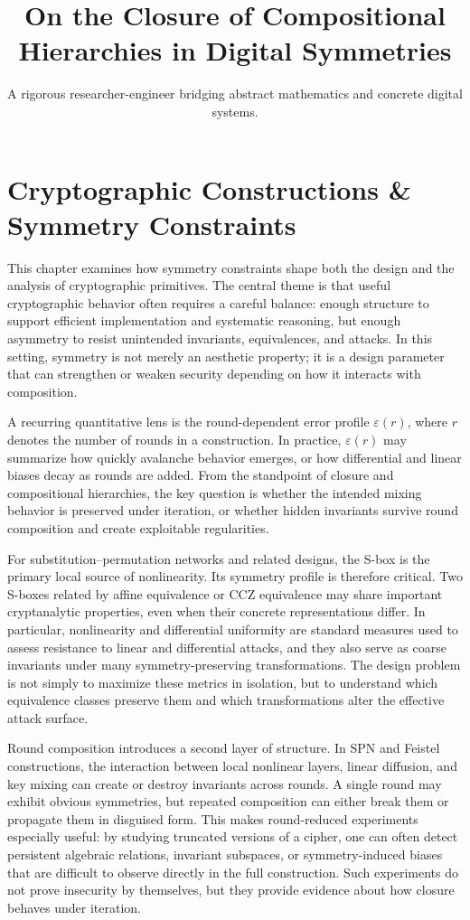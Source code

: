 \documentclass[11pt]{article}
\title{On the Closure of Compositional Hierarchies in Digital Symmetries}
\author{A rigorous researcher-engineer bridging abstract mathematics and concrete digital systems.}
\begin{document}
\section*{Cryptographic Constructions \& Symmetry Constraints}

This chapter examines how symmetry constraints shape both the design and the analysis of cryptographic primitives. The central theme is that useful cryptographic behavior often requires a careful balance: enough structure to support efficient implementation and systematic reasoning, but enough asymmetry to resist unintended invariants, equivalences, and attacks. In this setting, symmetry is not merely an aesthetic property; it is a design parameter that can strengthen or weaken security depending on how it interacts with composition.

A recurring quantitative lens is the round-dependent error profile \(\varepsilon(r)\), where \(r\) denotes the number of rounds in a construction. In practice, \(\varepsilon(r)\) may summarize how quickly avalanche behavior emerges, or how differential and linear biases decay as rounds are added. From the standpoint of closure and compositional hierarchies, the key question is whether the intended mixing behavior is preserved under iteration, or whether hidden invariants survive round composition and create exploitable regularities.

For substitution--permutation networks and related designs, the S-box is the primary local source of nonlinearity. Its symmetry profile is therefore critical. Two S-boxes related by affine equivalence or CCZ equivalence may share important cryptanalytic properties, even when their concrete representations differ. In particular, nonlinearity and differential uniformity are standard measures used to assess resistance to linear and differential attacks, and they also serve as coarse invariants under many symmetry-preserving transformations. The design problem is not simply to maximize these metrics in isolation, but to understand which equivalence classes preserve them and which transformations alter the effective attack surface.

Round composition introduces a second layer of structure. In SPN and Feistel constructions, the interaction between local nonlinear layers, linear diffusion, and key mixing can create or destroy invariants across rounds. A single round may exhibit obvious symmetries, but repeated composition can either break them or propagate them in disguised form. This makes round-reduced experiments especially useful: by studying truncated versions of a cipher, one can often detect persistent algebraic relations, invariant subspaces, or symmetry-induced biases that are difficult to observe directly in the full construction. Such experiments do not prove insecurity by themselves, but they provide evidence about how closure behaves under iteration.
\end{document}
